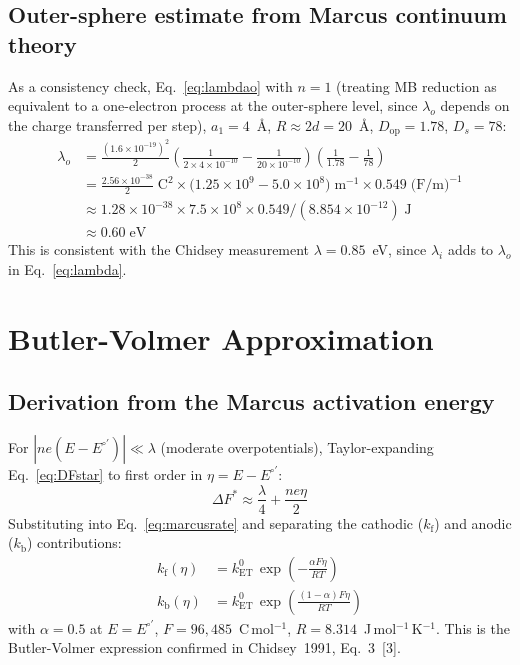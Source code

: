 \documentclass[10pt,a4paper]{article}
\numberwithin{equation}{section}
\newcommand{\kET}{k_{\text{ET}}^{0}}
\newcommand{\kf}{k_{\text{f}}}
\newcommand{\kb}{k_{\text{b}}}
\newcommand{\cit}[1]{[#1]}
\newcommand{\Eo}{E^{\circ\prime}}
\begin{document}
\subsection{Outer-sphere estimate from Marcus continuum theory}

As a consistency check, Eq.~\eqref{eq:lambdao} with $n=1$ (treating
MB reduction as equivalent to a one-electron process at the
outer-sphere level, since $\lambda_o$ depends on the charge
transferred per step), $a_1 = 4$~\AA, $R \approx 2d = 20$~\AA,
$D_{\text{op}} = 1.78$, $D_s = 78$:
\begin{align*}
  \lambda_o &= \frac{(1.6\times10^{-19})^2}{2}
  \!\left(\frac{1}{2\times4\times10^{-10}} - \frac{1}{20\times10^{-10}}\right)
  \!\left(\frac{1}{1.78} - \frac{1}{78}\right) \\
  &= \frac{2.56\times10^{-38}}{2}\;\text{C}^2
  \times\bigl(1.25\times10^{9} - 5.0\times10^{8}\bigr)\;\text{m}^{-1}
  \times 0.549\;\text{(F/m)}^{-1}\\
  &\approx 1.28\times10^{-38} \times 7.5\times10^8 \times 0.549
  / (8.854\times10^{-12})\;\text{J}\\
  &\approx 0.60\;\text{eV}
\end{align*}
This is consistent with the Chidsey measurement $\lambda = 0.85$~eV,
since $\lambda_i$ adds to $\lambda_o$ in Eq.~\eqref{eq:lambda}.

\section{Butler-Volmer Approximation}
\label{sec:bv}

\subsection{Derivation from the Marcus activation energy}

For $|n e(E - \Eo)| \ll \lambda$ (moderate overpotentials),
Taylor-expanding Eq.~\eqref{eq:DFstar} to first order in $\eta = E - \Eo$:
\begin{equation}
  \Delta F^* \approx \frac{\lambda}{4} + \frac{ne\eta}{2}
  \label{eq:DFlin}
\end{equation}
Substituting into Eq.~\eqref{eq:marcusrate} and separating the
cathodic ($\kf$) and anodic ($\kb$) contributions:
\begin{align}
  \kf(\eta) &= \kET\,\exp\!\left(-\frac{\alpha F\eta}{RT}\right)
  \label{eq:kf}\\
  \kb(\eta) &= \kET\,\exp\!\left(\frac{(1-\alpha)F\eta}{RT}\right)
  \label{eq:kb}
\end{align}
with $\alpha = 0.5$ at $E = \Eo$, $F = 96{,}485$~C\,mol$^{-1}$,
$R = 8.314$~J\,mol$^{-1}$\,K$^{-1}$. This is the Butler-Volmer
expression confirmed in Chidsey~1991, Eq.~3~\cit{3}.
\end{document}
